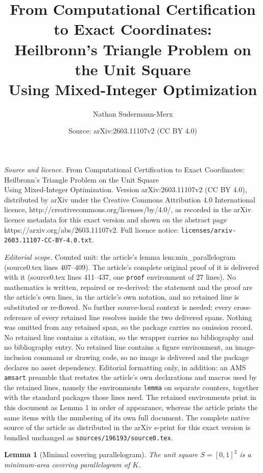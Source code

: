 \documentclass[10pt,a4paper]{amsart}
\title{From Computational Certification to Exact Coordinates:\\ Heilbronn's Triangle Problem on the Unit Square\\ Using Mixed-Integer Optimization}
\author{Nathan Sudermann-Merx}
\date{Source: arXiv:2603.11107v2 (CC BY 4.0)}
\newtheorem{lemma}{Lemma}
\begin{document}
\maketitle

\noindent\emph{Source and licence.} From Computational Certification to Exact Coordinates:\\ Heilbronn's Triangle Problem on the Unit Square\\ Using Mixed-Integer Optimization. Version arXiv:2603.11107v2 (CC BY 4.0), distributed by arXiv under the Creative Commons Attribution 4.0 International licence, http://creativecommons.org/licenses/by/4.0/, as recorded in the arXiv licence metadata for this exact version and shown on the abstract page https://arxiv.org/abs/2603.11107v2. Full licence notice: \texttt{licenses/arxiv-2603.11107-CC-BY-4.0.txt}.\par\smallskip

\noindent\textit{Editorial scope.} Counted unit: the article's lemma lem:min\_parallelogram (source0.tex lines 407--409). The article's complete original proof of it is delivered with it (source0.tex lines 411--437, one \texttt{proof} environment of 27 lines). No mathematics is written, repaired or re-derived: the statement and the proof are the article's own lines, in the article's own notation, and no retained line is substituted or re-flowed.  No further source-local context is needed: every cross-reference of every retained line resolves inside the two delivered spans.  Nothing was omitted from any retained span, so the package carries no omission record.  No retained line contains a citation, so the wrapper carries no bibliography and no bibliography entry.  No retained line contains a figure environment, an image-inclusion command or drawing code, so no image is delivered and the package declares no asset dependency.  Editorial formatting only, in addition: an AMS \texttt{amsart} preamble that restates the article's own declarations and macros used by the retained lines, namely the environments \texttt{lemma} on separate counters, together with the standard packages those lines need.  The retained environments print in this document as Lemma 1 in order of appearance, whereas the article prints the same items with the numbering of its own full document.  The complete native source of the article as distributed in the arXiv e-print for this exact version is bundled unchanged as \texttt{sources/196193/source0.tex}.
\begin{lemma}[Minimal covering parallelogram]\label{lem:min_parallelogram}
The unit square $S=[0,1]^2$ is a minimum-area covering parallelogram of $K$.
\end{lemma}
\end{document}
